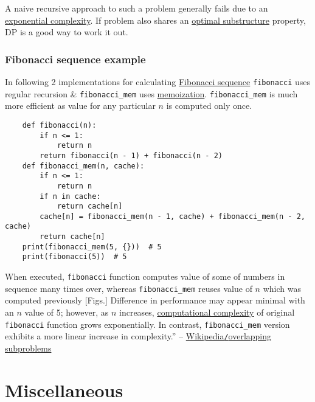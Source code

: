 \documentclass{article}
\begin{document}
A naive recursive approach to such a problem generally fails due to an \href{https://en.wikipedia.org/wiki/Exponential_time}{exponential complexity}. If problem also shares an \href{https://en.wikipedia.org/wiki/Optimal_substructure}{optimal substructure} property, DP is a good way to work it out.

\subsubsection{Fibonacci sequence example}
In following 2 implementations for calculating \href{https://en.wikipedia.org/wiki/Fibonacci_sequence}{Fibonacci sequence} {\tt fibonacci} uses regular recursion \& \verb|fibonacci_mem| uses \href{https://en.wikipedia.org/wiki/Memoization}{memoization}. \verb|fibonacci_mem| is much more efficient as value for any particular $n$ is computed only once.
\begin{verbatim}
	def fibonacci(n):
	    if n <= 1:
	        return n
	    return fibonacci(n - 1) + fibonacci(n - 2)
	def fibonacci_mem(n, cache):
	    if n <= 1:
	        return n
	    if n in cache:
	        return cache[n]
	    cache[n] = fibonacci_mem(n - 1, cache) + fibonacci_mem(n - 2, cache)
	    return cache[n]
	print(fibonacci_mem(5, {}))  # 5
	print(fibonacci(5))  # 5
\end{verbatim}
When executed, {\tt fibonacci} function computes value of some of numbers in sequence many times over, whereas \verb|fibonacci_mem| reuses value of $n$ which was computed previously [Figs.] Difference in performance may appear minimal with an $n$ value of 5; however, as $n$ increases, \href{https://en.wikipedia.org/wiki/Computational_complexity}{computational complexity} of original {\tt fibonacci} function grows exponentially. In contrast, \verb|fibonacci_mem| version exhibits a more linear increase in complexity.'' -- \href{https://en.wikipedia.org/wiki/Overlapping_subproblems}{Wikipedia{\tt/}overlapping subproblems}


\section{Miscellaneous}


\printbibliography[heading=bibintoc]
	
\end{document}
